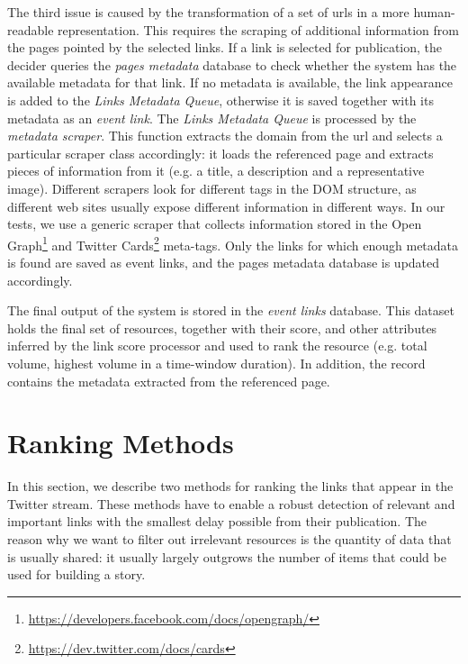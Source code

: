 \documentclass{sig-alternate-somus}
\begin{document}
The third issue is caused by the transformation of a set of urls in a more human-readable representation. This requires the scraping of additional information from the pages pointed by the selected links. If a link is selected for publication, the decider queries the \emph{pages metadata} database to check whether the system has the available metadata for that link. If no metadata is available, the link appearance is added to the \emph{Links Metadata Queue}, otherwise it is saved together with its metadata as an \emph{event link}. The \emph{Links Metadata Queue} is processed by the \emph{metadata scraper}. This function extracts the domain from the url and selects a particular scraper class accordingly: it loads the referenced page and extracts pieces of information from it (e.g. a title, a description and a representative image). Different scrapers look for different tags in the DOM structure, as different web sites usually expose different information in different ways. In our tests, we use a generic scraper that collects information stored in the Open Graph\footnote{\url{https://developers.facebook.com/docs/opengraph/}} and Twitter Cards\footnote{\url{https://dev.twitter.com/docs/cards}} meta-tags. Only the links for which enough metadata is found are saved as event links, and the pages metadata database is updated accordingly.

The final output of the system is stored in the \emph{event links} database. This dataset holds the final set of resources, together with their score, and other attributes inferred by the link score processor and used to rank the resource (e.g. total volume, highest volume in a time-window duration). In addition, the record contains the metadata extracted from the referenced page.


\section{Ranking Methods}
\label{sec:ranking_methods}
In this section, we describe two methods for ranking the links that appear in the Twitter stream. These methods have to enable a robust detection of relevant and important links with the smallest delay possible from their publication. The reason why we want to filter out irrelevant resources is the quantity of data that is usually shared: it usually largely outgrows the number of items that could be used for building a story.
\end{document}
